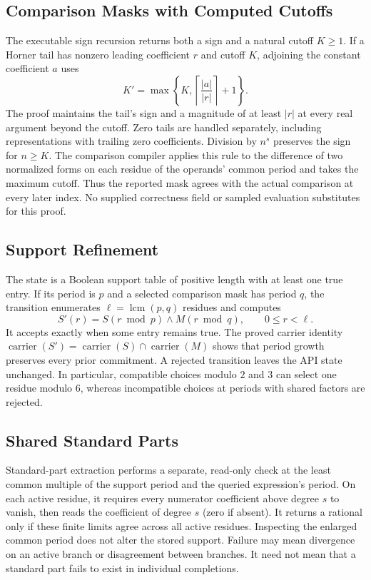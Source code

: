 \documentclass[11pt,a4paper]{article}
\theoremstyle{result}
\theoremstyle{definition}
\begin{document}
\subsection{Comparison Masks with Computed Cutoffs}

The executable sign recursion returns both a sign and a natural cutoff $K\ge1$. If a Horner tail has nonzero leading coefficient $r$ and cutoff $K$, adjoining the constant coefficient $a$ uses
\[
  K'=\max\!\left\{K,\left\lceil\frac{|a|}{|r|}\right\rceil+1\right\}.
\]
The proof maintains the tail's sign and a magnitude of at least $|r|$ at every real argument beyond the cutoff. Zero tails are handled separately, including representations with trailing zero coefficients. Division by $n^s$ preserves the sign for $n\ge K$. The comparison compiler applies this rule to the difference of two normalized forms on each residue of the operands' common period and takes the maximum cutoff. Thus the reported mask agrees with the actual comparison at every later index. No supplied correctness field or sampled evaluation substitutes for this proof.

\subsection{Support Refinement}

The state is a Boolean support table of positive length with at least one true entry. If its period is $p$ and a selected comparison mask has period $q$, the transition enumerates $\ell=\operatorname{lcm}(p,q)$ residues and computes
\[
  S'(r)=S(r\bmod p)\land M(r\bmod q),\qquad 0\le r<\ell.
\]
It accepts exactly when some entry remains true. The proved carrier identity $\operatorname{carrier}(S')=\operatorname{carrier}(S)\cap\operatorname{carrier}(M)$ shows that period growth preserves every prior commitment. A rejected transition leaves the API state unchanged. In particular, compatible choices modulo $2$ and $3$ can select one residue modulo $6$, whereas incompatible choices at periods with shared factors are rejected.

\subsection{Shared Standard Parts}

Standard-part extraction performs a separate, read-only check at the least common multiple of the support period and the queried expression's period. On each active residue, it requires every numerator coefficient above degree $s$ to vanish, then reads the coefficient of degree $s$ (zero if absent). It returns a rational only if these finite limits agree across all active residues. Inspecting the enlarged common period does not alter the stored support. Failure may mean divergence on an active branch or disagreement between branches. It need not mean that a standard part fails to exist in individual completions.
\end{document}
